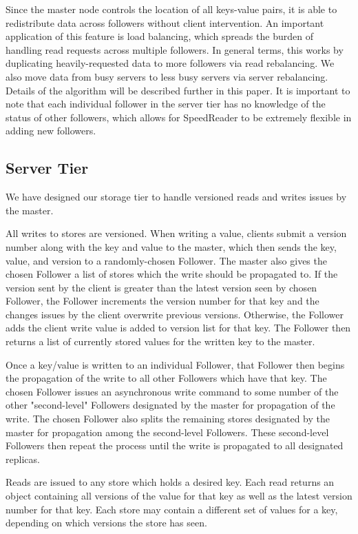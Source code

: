\documentclass[twoside]{article}
\begin{document}
\begin{multicols}{2}
Since the master node controls the location of all keys-value pairs, it is able to redistribute data across followers without client intervention. An important application of this feature is load balancing, which spreads the burden of handling read requests across multiple followers. In general terms, this works by duplicating heavily-requested data to more followers via read rebalancing. We also move data from busy servers to less busy servers via server rebalancing. Details of the algorithm will be described further in this paper. It is important to note that each individual follower in the server tier has no knowledge of the status of other followers, which allows for SpeedReader to be extremely flexible in adding new followers. 

\subsection*{Server Tier}
We have designed our storage tier to handle versioned reads and writes issues by the master. 

All writes to stores are versioned. When writing a value, clients submit a version number along with the key and value to the master, which then sends the key, value, and version to a randomly-chosen Follower. The master also gives the chosen Follower a list of stores which the write should be propagated to. If the version sent by the client is greater than the latest version seen by chosen Follower, the Follower increments the version number for that key and the changes issues by the client overwrite previous versions. Otherwise, the Follower adds the client write value is added to version list for that key. The Follower then returns a list of currently stored values for the written key to the master.

Once a key/value is written to an individual Follower, that Follower then begins the propagation of the write to all other Followers which have that key. The chosen Follower issues an asynchronous write command to some number of the other "second-level" Followers designated by the master for propagation of the write. The chosen Follower also splits the remaining stores designated by the master for propagation among the second-level Followers. These second-level Followers then repeat the process until the write is propagated to all designated replicas.

Reads are issued to any store which holds a desired key. Each read returns an object containing all versions of the value for that key as well as the latest version number for that key. Each store may contain a different set of values for a key, depending on which versions the store has seen.


\end{multicols}
\end{document}
